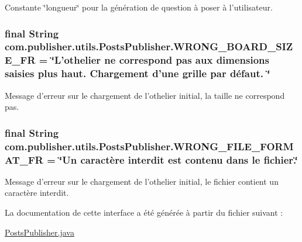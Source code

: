 Constante \char`\"{}longueur\char`\"{} pour la génération de question à poser à l'utilisateur. \hypertarget{interfacecom_1_1publisher_1_1utils_1_1PostsPublisher_a08e37250846360cc0ca5db46e0be6d3c}{
\subsubsection[{W\-R\-O\-N\-G\-\_\-\-B\-O\-A\-R\-D\-\_\-\-S\-I\-Z\-E\-\_\-\-F\-R}]{\setlength{\rightskip}{0pt plus 5cm}final String com.\-publisher.\-utils.\-Posts\-Publisher.\-W\-R\-O\-N\-G\-\_\-\-B\-O\-A\-R\-D\-\_\-\-S\-I\-Z\-E\-\_\-\-F\-R = \char`\"{}L'othelier ne correspond pas aux dimensions saisies plus haut. Chargement d'une grille par défaut. \char`\"{}\hspace{0.3cm}{\ttfamily [static]}}}\label{interfacecom_1_1publisher_1_1utils_1_1PostsPublisher_a08e37250846360cc0ca5db46e0be6d3c}
Message d'erreur sur le chargement de l'othelier initial, la taille ne correspond pas. \hypertarget{interfacecom_1_1publisher_1_1utils_1_1PostsPublisher_a313ff71a9df92d5bcfa51b03c0c53248}{
\subsubsection[{W\-R\-O\-N\-G\-\_\-\-F\-I\-L\-E\-\_\-\-F\-O\-R\-M\-A\-T\-\_\-\-F\-R}]{\setlength{\rightskip}{0pt plus 5cm}final String com.\-publisher.\-utils.\-Posts\-Publisher.\-W\-R\-O\-N\-G\-\_\-\-F\-I\-L\-E\-\_\-\-F\-O\-R\-M\-A\-T\-\_\-\-F\-R = \char`\"{}Un caractère interdit est contenu dans le fichier.\char`\"{}\hspace{0.3cm}{\ttfamily [static]}}}\label{interfacecom_1_1publisher_1_1utils_1_1PostsPublisher_a313ff71a9df92d5bcfa51b03c0c53248}
Message d'erreur sur le chargement de l'othelier initial, le fichier contient un caractère interdit. 

La documentation de cette interface a été générée à partir du fichier suivant \-:\begin{DoxyCompactItemize}
\item 
\hyperlink{PostsPublisher_8java}{Posts\-Publisher.\-java}\end{DoxyCompactItemize}
